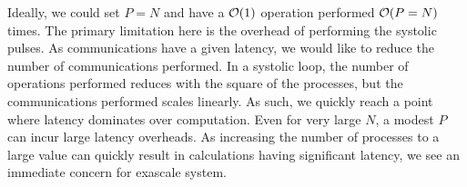 Ideally, we could set $P = N$ and have a $\mathcal{O}{(1)}$ operation performed
$\mathcal{O}{(P = N)}$ times.
%
The primary limitation here is the overhead of performing the systolic
pulses.
%
As communications have a given latency, we would like to reduce the number
of communications performed.
%
In a systolic loop, the number of operations performed reduces with
the square of the processes, but the communications performed scales linearly.
%
As such, we quickly reach a point where latency dominates over computation.
%
Even for very large $N$, a modest $P$ can incur large latency overheads.
%
As increasing the number of processes to a large value
can quickly result in calculations having significant latency,
we see an immediate concern for exascale system.
